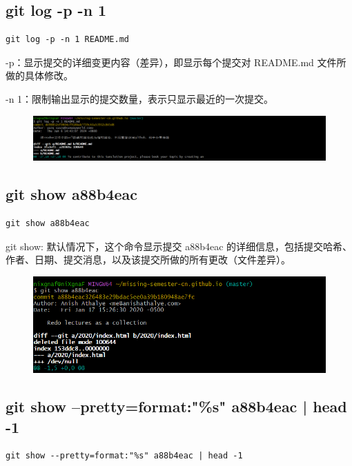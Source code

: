 \documentclass{article}
\begin{document}
\subsection{git log -p -n 1}
\lstset{language=bash}
\begin{lstlisting}
git log -p -n 1 README.md
\end{lstlisting}

\noindent -p：显示提交的详细变更内容（差异），即显示每个提交对 README.md 文件所做的具体修改。

\noindent -n 1：限制输出显示的提交数量，表示只显示最近的一次提交。

\begin{figure}[h]
    \centering
    \includegraphics[width=1\linewidth]{picture/gitlog1.png}
\end{figure}

\subsection{git show a88b4eac}
\lstset{language=bash}
\begin{lstlisting}
git show a88b4eac
\end{lstlisting}

\noindent git show: 默认情况下，这个命令显示提交 a88b4eac 的详细信息，包括提交哈希、作者、日期、提交消息，以及该提交所做的所有更改（文件差异）。

\begin{figure}[h]
    \centering
    \includegraphics[width=1\linewidth]{picture/gitshow4.png}
\end{figure}

\subsection{git show --pretty=format:"\%s" a88b4eac | head -1}
\lstset{language=bash}
\begin{lstlisting}
git show --pretty=format:"%s" a88b4eac | head -1
\end{lstlisting}
\end{document}
